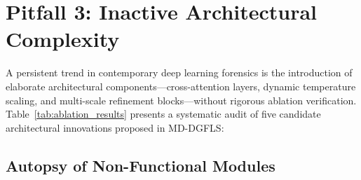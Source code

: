 \documentclass[conference]{IEEEtran}
\begin{document}
\section{Pitfall 3: Inactive Architectural Complexity}

A persistent trend in contemporary deep learning forensics is the introduction of elaborate architectural components—cross-attention layers, dynamic temperature scaling, and multi-scale refinement blocks—without rigorous ablation verification. Table~\ref{tab:ablation_results} presents a systematic audit of five candidate architectural innovations proposed in MD-DGFLS:



\subsection{Autopsy of Non-Functional Modules}
\end{document}
